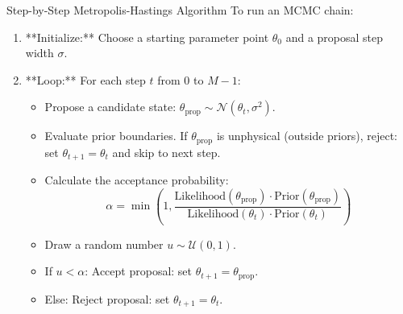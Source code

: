 \documentclass[9pt]{beamer}
\begin{document}
\begin{frame}{Step-by-Step Metropolis-Hastings Algorithm}
  To run an MCMC chain:
  \begin{enumerate}
    \item **Initialize:** Choose a starting parameter point $\theta_0$ and a proposal step width $\sigma$.
    \item **Loop:** For each step $t$ from $0$ to $M-1$:
      \begin{itemize}
        \item Propose a candidate state: $\theta_{\text{prop}} \sim \mathcal{N}(\theta_t, \sigma^2)$.
        \item Evaluate prior boundaries. If $\theta_{\text{prop}}$ is unphysical (outside priors), reject: set $\theta_{t+1} = \theta_t$ and skip to next step.
        \item Calculate the acceptance probability:
          $$\alpha = \min\left(1, \frac{\text{Likelihood}(\theta_{\text{prop}}) \cdot \text{Prior}(\theta_{\text{prop}})}{\text{Likelihood}(\theta_t) \cdot \text{Prior}(\theta_t)}\right)$$
        \item Draw a random number $u \sim \mathcal{U}(0, 1)$.
        \item If $u < \alpha$:
          Accept proposal: set $\theta_{t+1} = \theta_{\text{prop}}$.
        \item Else:
          Reject proposal: set $\theta_{t+1} = \theta_t$.
      \end{itemize}
  \end{enumerate}
\end{frame}
\end{document}
